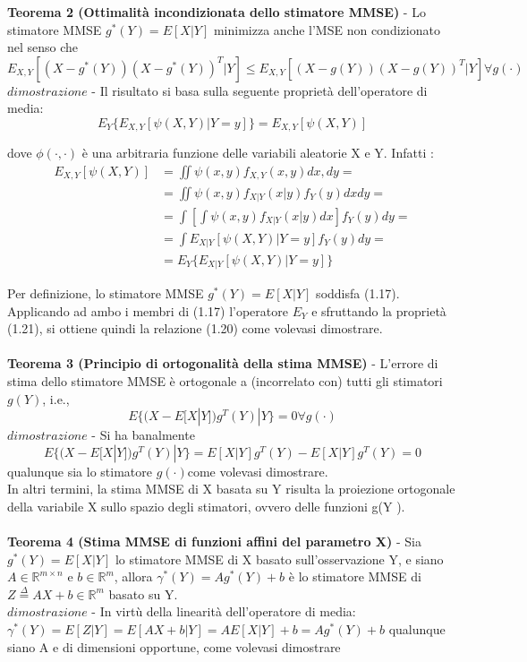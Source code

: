 \textbf{Teorema 2 (Ottimalità incondizionata dello stimatore MMSE)} - Lo stimatore
MMSE $g^*(Y)=E[X|Y]$ minimizza anche l’MSE non condizionato nel senso che
\begin{equation}
E_{X,Y}[(X-g^*(Y))(X-g^*(Y))^T|Y]\le E_{X,Y}[(X-g(Y))(X-g(Y))^T|Y]\forall g(\cdot) \nonumber
\end{equation}
$dimostrazione$ - Il risultato si basa sulla seguente proprietà dell’operatore di media:
\begin{equation}
E_Y\{E_{X,Y}[\psi(X,Y)|Y=y]\}=E_{X,Y}[\psi(X,Y)] \nonumber
\end{equation}

dove $\phi(\cdot,\cdot)$ è una arbitraria funzione delle variabili aleatorie X e Y.
Infatti :
\begin{align}
E_{X,Y}[\psi(X,Y)]&= \iint \psi(x,y)f_{X,Y}(x,y)dx,dy=\nonumber\\
&= \iint \psi(x,y)f_{X|Y}(x|y)f_Y(y)dxdy=\nonumber \\
&=\int [\int \psi(x,y)f_{X|Y}(x|y)dx]f_Y(y)dy=\nonumber\\
&=\int E_{X|Y}[\psi(X,Y)|Y=y]f_Y(y)dy= \nonumber\\
&=E_Y\{E_{X|Y}[\psi(X,Y)|Y=y]\}\nonumber
\end{align}


Per definizione, lo stimatore MMSE $g^*(Y)=E[X|Y]$ soddisfa (1.17). Applicando ad ambo i membri di (1.17) l’operatore $E_Y$ e sfruttando la proprietà (1.21), si ottiene quindi la relazione (1.20) come volevasi dimostrare.\\\\
\textbf{Teorema 3 (Principio di ortogonalità della stima MMSE)} - L’errore di stima dello stimatore MMSE è ortogonale a (incorrelato con) tutti gli stimatori $g(Y)$, i.e.,\\
\begin{equation}
 E\{(X-E[X|Y])g^T(Y)|Y\}=0 \forall g(\cdot)\nonumber
\end{equation}
$dimostrazione$ - Si ha banalmente
\begin{equation}
E\{(X-E[X|Y])g^T(Y)|Y\}=E[X|Y]g^T(Y)-E[X|Y]g^T(Y)=0
\end{equation}
qualunque sia lo stimatore $g(\cdot)$come volevasi dimostrare.\\
In altri termini, la stima MMSE di X basata su Y risulta la proiezione ortogonale
della variabile X sullo spazio degli stimatori, ovvero delle funzioni g(Y ).\\\\
\textbf{Teorema 4 (Stima MMSE di funzioni affini del parametro X)} - Sia $g^*(Y)=E[X|Y]$ lo stimatore MMSE di X basato sull’osservazione Y, e siano $A \in\mathbb{R}^{m\times n}$ e $b\in\mathbb{R}^m $, allora $\gamma^*(Y)=Ag^*(Y)+b$ è lo stimatore MMSE di $Z\stackrel{\Delta}{=}AX+b\in\mathbb{R}^m$ basato su Y.\\
$dimostrazione $ - In virtù della linearità dell’operatore di media: $\gamma^*(Y)=E[Z|Y]=E[AX+b|Y]=AE[X|Y]+b=Ag^*(Y)+b$ qualunque siano A e di dimensioni opportune, come volevasi dimostrare
\newpage

